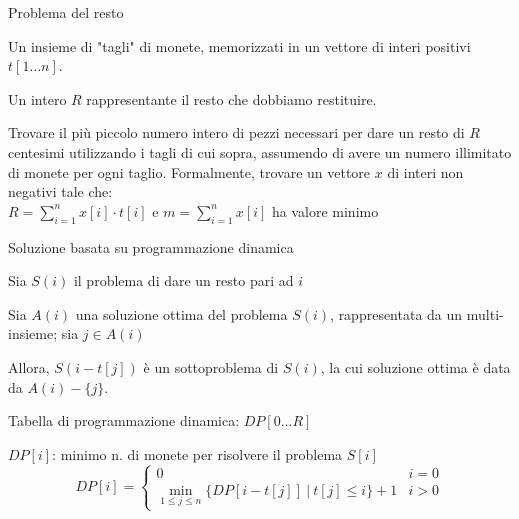 \begin{frame}{Problema del resto}

\vspace{-9pt}
\begin{myboxtitle}[Input]
\BI
\item Un insieme di "tagli" di monete, memorizzati in un vettore di interi positivi $t[1 \ldots n]$.
\item Un intero $R$ rappresentante il resto che dobbiamo restituire.
\EI
\end{myboxtitle}

\smallskip
\begin{myboxtitle}
Trovare il più piccolo numero intero di pezzi necessari per dare un resto di $R$ 
centesimi utilizzando i tagli di cui sopra, assumendo di avere un numero illimitato di
monete per ogni taglio.
Formalmente, trovare un vettore $x$ di interi non negativi tale che:\\
$\displaystyle
	R = \sum_{i=1}^n x[i] \cdot t[i]
$ \qquad
e \qquad $m = \sum_{i=1}^n x[i]$ ha valore minimo


\end{myboxtitle}

\end{frame}

\begin{frame}{Soluzione basata su programmazione dinamica}

\vspace{-9pt}
\begin{myboxtitle}
\BI
\item Sia $S(i)$ il problema di dare un resto pari ad $i$
\item Sia $A(i)$ una soluzione ottima del problema $S(i)$, rappresentata da un 
multi-insieme; sia $j \in A(i)$
\item Allora, $S(i-t[j])$ è un sottoproblema di
$S(i)$, la cui soluzione ottima è data da $A(i)-\{ j \}$.
\EI
\end{myboxtitle}

\begin{myboxtitle}
\BI
\item Tabella di programmazione dinamica: $DP[0 \ldots R]$
\item $DP[i]$: \alert{minimo n. di monete per risolvere il problema $S[i]$}
\EI
\[
DP[i] = \left\{ 
\begin{array}{ll}
  0 & i=0 \\
  \min_{1 \leq j \leq n} \{ DP[i-t[j]] ~|~ t[j] \leq i \} + 1 & i>0
  \end{array} 
\right.
\]
\end{myboxtitle}


\end{frame}

